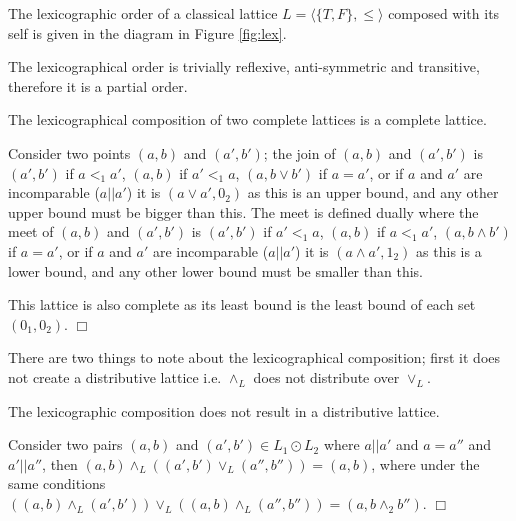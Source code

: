 The lexicographic order of a classical lattice $L = \langle \{T,F\}, \leq \rangle$ 
composed with its self is given in the diagram in Figure \ref{fig:lex}.

The lexicographical order is trivially reflexive, anti-symmetric and transitive, therefore it is a partial order.
\begin{prop}
The lexicographical composition of two complete lattices is a complete lattice.
\end{prop}
\begin{prof}
Consider two points $(a,b)$ and $(a',b')$; 
the join of $(a,b)$ and $(a',b')$ is $(a',b')$ if $a <_1 a'$,
$(a,b)$ if $a' <_1 a$,
$(a, b \vee b')$ if $a = a'$,
or if $a$ and $a'$ are incomparable ($a||a'$) it is $(a \vee a', 0_2)$
as this is an upper bound, and any other upper bound must be bigger than this.
The meet is defined dually where the meet of $(a,b)$ and $(a',b')$ is $(a',b')$ if $a' <_1 a$,
$(a,b)$ if $a <_1 a'$,
$(a, b \wedge b')$ if $a = a'$,
or if $a$ and $a'$ are incomparable ($a||a'$) it is $(a \wedge a',1_2)$
as this is a lower bound, and any other lower bound must be smaller than this.

This lattice is also complete as its least bound is the least bound of each set $(0_1,0_2)$.
$\Box$\end{prof}

There are two things to note about the lexicographical composition; 
first it does not create a distributive lattice i.e. $\wedge_L$ does not distribute over $\vee_L$.
\begin{prop}
The lexicographic composition does not result in a distributive lattice.
\end{prop}
\begin{prof}
Consider two pairs $(a,b)$ and $(a', b') \in L_1 \odot L_2$ where $a || a'$ and $a = a''$ and $a' || a''$,
then $(a,b) \wedge_{L} ((a', b') \vee_{L} (a'', b'')) = (a,b)$,
where under the same conditions $((a,b) \wedge_{L} (a', b')) \vee_{L} ((a,b) \wedge_{L} (a'', b'')) = (a,b \wedge_2 b'')$.
$\Box$\end{prof}


